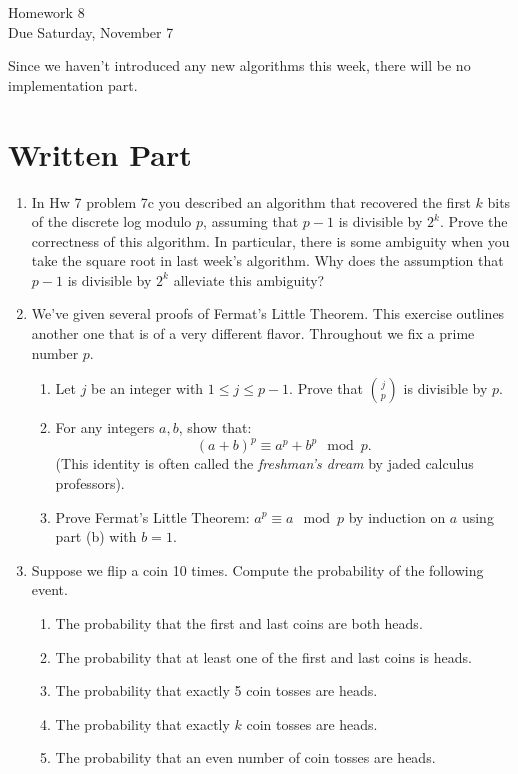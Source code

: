 \documentclass[11pt]{article}
\begin{document}
\begin{center}
\Large {Homework 8}\\
\small {Due Saturday, November 7}
\end{center}
Since we haven't introduced any new algorithms this week, there will be no implementation part.
\section*{Written Part}
\begin{enumerate}
  \item{
  In Hw 7 problem 7c you described an algorithm that recovered the first $k$ bits of the discrete log modulo $p$, assuming that $p-1$ is divisible by $2^k$.  Prove the correctness of this algorithm.  In particular, there is some ambiguity when you take the square root in last week's algorithm.  Why does the assumption that $p-1$ is divisible by $2^k$ alleviate this ambiguity?
  }
  \item{
  We've given several proofs of Fermat's Little Theorem.  This exercise outlines another one that is of a very different flavor.  Throughout we fix a prime number $p$.
  \begin{enumerate}
    \item{
    Let $j$ be an integer with $1\le j\le p-1$.  Prove that $j\choose p$ is divisible by $p$.
    }
    \item{
    For any integers $a,b$, show that:
    \[(a+b)^p\equiv a^p + b^p\mod p.\]
    (This identity is often called the \textit{freshman's dream} by jaded calculus professors).
    }
    \item{
    Prove Fermat's Little Theorem: $a^p\equiv a\mod p$ by induction on $a$ using part (b) with $b=1$.
    }
  \end{enumerate}
  }
  \item{
  Suppose we flip a coin 10 times.  Compute the probability of the following event.
  \begin{enumerate}
    \item{
    The probability that the first and last coins are both heads.
    }
    \item{
    The probability that at least one of the first and last coins is heads.
    }
    \item{
    The probability that exactly 5 coin tosses are heads.
    }
    \item{
    The probability that exactly $k$ coin tosses are heads.
    }
    \item{
    The probability that an even number of coin tosses are heads.
}
\end{enumerate}}
\end{enumerate}
\end{document}
